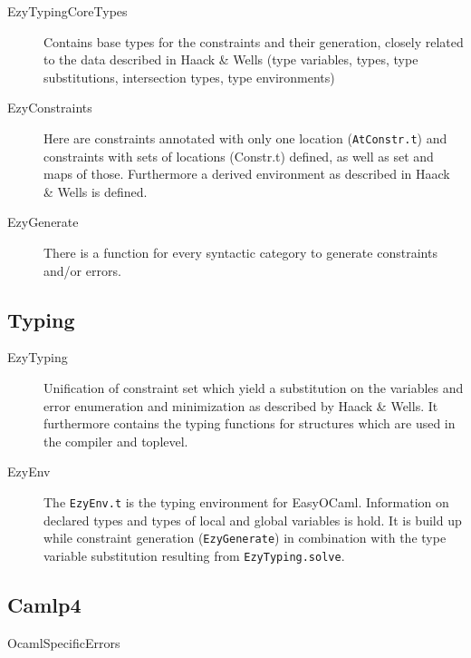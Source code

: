 \begin{description}
    \item[EzyTypingCoreTypes] Contains base types for the 
        constraints and their generation, closely related to the data 
        described in Haack \& Wells (type variables, types, type 
        substitutions, intersection types, type environments)
    \item[EzyConstraints] Here are constraints annotated with only 
        one location (\texttt{AtConstr.t}) and constraints with sets of 
        locations (Constr.t) defined, as well as set and maps of those.  
        Furthermore a derived environment as described in Haack \& Wells 
        is defined.
    \item[EzyGenerate] There is a function for every syntactic 
        category to generate constraints and/or errors.
\end{description}

\subsection{Typing}

\begin{description}
    \item[EzyTyping] Unification of constraint set which yield a 
        substitution on the variables and error enumeration and 
        minimization as described by Haack \& Wells.  It furthermore 
        contains the typing functions for structures which are used in 
        the compiler and toplevel.
    \item[EzyEnv] The \texttt{EzyEnv.t} is the typing environment 
        for EasyOCaml. Information on declared types and types of local 
        and global variables is hold.  It is build up while constraint 
        generation (\texttt{EzyGenerate}) in combination with the type 
        variable substitution resulting from \texttt{EzyTyping.solve}.
\end{description}


\subsection{Camlp4}
\begin{description}
  \item[OcamlSpecificErrors]
    \label{mod:ocamlspecificerrors}
\end{description}
